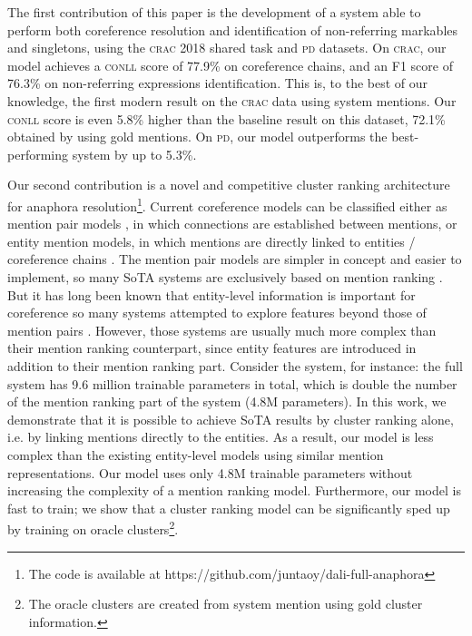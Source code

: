 \documentclass[10pt, a4paper]{article}
\newcommand{\ACRO}[1]{\textsc{#1}}
\newcommand{\CONLL}{\ACRO{conll}}
\newcommand{\CRAC}{\ACRO{crac}}
\newcommand{\PD}{\ACRO{pd}}
\begin{document}
The first contribution of this paper is the development of a system able to perform both coreference resolution and identification of non-referring markables and singletons, using the {\CRAC} 2018 shared task and {\PD} datasets. 
On {\CRAC}, our model achieves a {\CONLL} score of 77.9\% on coreference chains, and an  F1 score of 76.3\% on non-referring expressions identification. 
This is, to the best of our knowledge, the first modern result on the {\CRAC} data using system mentions. 
Our {\CONLL} score is even 5.8\% higher than the baseline result on this dataset, 72.1\% obtained by \cite{poesio2018crac} using gold mentions. 
On {\PD}, our model outperforms the best-performing system by up to 5.3\%.


Our second contribution is a novel and competitive cluster ranking architecture for anaphora resolution\footnote{The code is available at 
https://github.com/juntaoy/dali-full-anaphora}.
Current coreference models can be classified either as mention pair models \cite{soon-et-al:CL01}, in which connections are established between mentions, or entity mention models, in which mentions are directly linked to  entities / coreference chains  \cite{luo-et-al:ACL04,rahman&ng:JAIR11}.  
The mention pair models are simpler in concept and easier to implement, so many SoTA systems are exclusively based on mention ranking  \cite{wiseman2015learning,clark2016deep,lee2017end}. 
But it  has long been known that  entity-level information is important for coreference \cite{luo-et-al:ACL04,poesio-stuckardt-versley:book} so many systems attempted to explore features beyond those of mention pairs \cite{bjorkelund2014learning,clark2015entity,clark2016improving,lee2018higher,kantor2019bertee,joshi2019bert,joshi2019spanbert}.  
However, those systems are usually much more complex than their mention ranking counterpart, since entity features are introduced in addition to their mention ranking part. 
Consider the  system, for instance: the full system has 9.6 million trainable parameters in total, 
which is double the number of 
the mention ranking part of the system (4.8M parameters). In this work, we demonstrate that it is possible to achieve SoTA results by cluster ranking alone, i.e. by linking mentions directly to the entities. As a result, our model is less complex than the existing entity-level models \cite{lee2018higher,kantor2019bertee} using similar mention representations. 
Our model uses only 4.8M trainable parameters without increasing the complexity of a mention ranking model. 
Furthermore, our model is fast to train; we show that a cluster ranking model can be significantly sped up by training on oracle clusters\footnote{The oracle clusters are created from system mention using gold cluster information.}.
\end{document}
